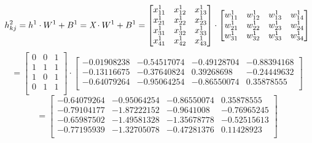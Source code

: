\documentclass[a4paper,12pt,oneside]{book}
\begin{document}
\begin{equation*}
    h^2_{kj}=h^1\cdot W^1 + B^1 = \textit{X} \cdot W^1 + B^1\\
    = \begin{bmatrix}
        x^1_{11} & x^1_{12} & x^1_{13} \\
        x^1_{21} & x^1_{22} & x^1_{23} \\
        x^1_{31} & x^1_{32} & x^1_{33} \\
        x^1_{41} & x^1_{42} & x^1_{43} \\
    \end{bmatrix} \cdot
    \begin{bmatrix}
        w^1_{11} & w^1_{12} & w^1_{13} & w^1_{14} \\
        w^1_{21} & w^1_{22} & w^1_{23} & w^1_{24} \\
        w^1_{31} & w^1_{32} & w^1_{33} & w^1_{34} \\
    \end{bmatrix} 
\end{equation*}
\begin{equation*}
    = \begin{bmatrix}
        0 & 0 & 1\\
        1 & 1 & 1\\
        1 & 0 & 1\\
        0 & 1 & 1\\
    \end{bmatrix} \cdot
    \begin{bmatrix}
        -0.01908238 & -0.54517074 & -0.49128704 & -0.88394168\\
        -0.13116675 & -0.37640824 & 0.39268698 & -0.24449632\\
        -0.64079264 & -0.95064254 & -0.86550074 & 0.35878555\\
    \end{bmatrix}    
\end{equation*}
\begin{equation*}
    = \begin{bmatrix}
        -0.64079264 & -0.95064254 & -0.86550074 & 0.35878555\\
        -0.79104177 & -1.87222152 & -0.9641008 & -0.76965245\\
        -0.65987502 & -1.49581328 & -1.35678778 & -0.52515613\\
        -0.77195939 & -1.32705078 & -0.47281376 & 0.11428923\\
    \end{bmatrix}    
\end{equation*}
\end{document}
